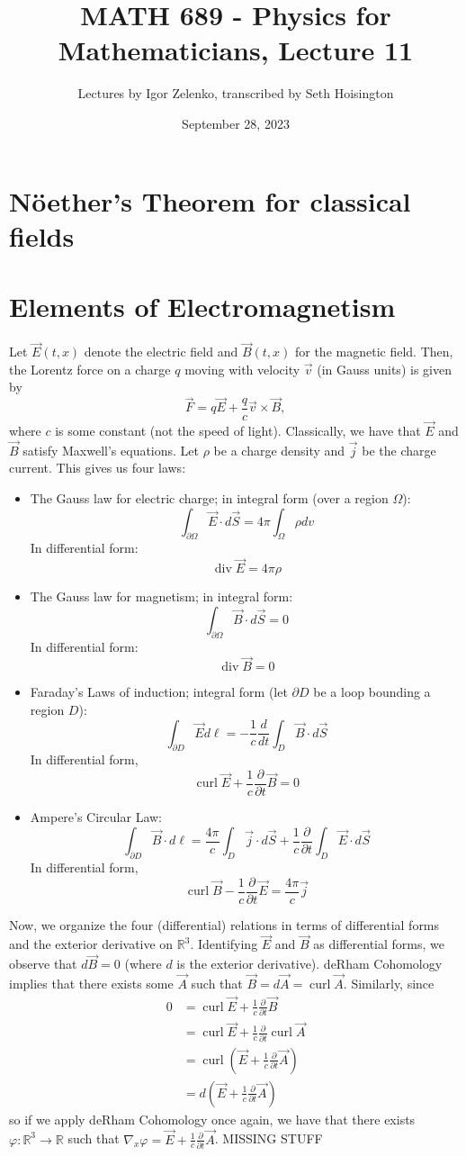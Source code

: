 \documentclass{article}
\title{MATH 689 - Physics for Mathematicians, Lecture 11}
\author{Lectures by Igor Zelenko, transcribed by Seth Hoisington}
\date{September 28, 2023}
\newcommand{\R}{\mathbb R}
\newcommand{\vhi}{\varphi}
\newcommand{\pd}[1]{\frac{\partial}{\partial #1}}
\DeclareMathOperator{\Div}{div}
\DeclareMathOperator{\curl}{curl}
\begin{document}
\maketitle

\section{N\"oether's Theorem for classical fields}
\section{Elements of Electromagnetism}
Let $\vec E(t,x)$ denote the electric field and $\vec B(t,x)$ for the magnetic field. Then, the Lorentz force on  a charge $q$ moving with velocity $\vec v$ (in Gauss units) is given by
\[\vec F = q\vec E + \frac{q}{c}\vec v\times \vec B,\]
where $c$ is some constant (not the speed of light). Classically, we have that $\vec E$ and $\vec B$ satisfy Maxwell's equations. Let $\rho$ be a charge density and $\vec j$ be the charge current. This gives us four laws:
\begin{itemize}
    \item The Gauss law for electric charge; in integral form (over a region $\Omega$):
    \[\int_{\partial \Omega} \vec E\cdot d\vec S = 4\pi \int_\Omega \rho dv\]
    In differential form:
    \[\Div \vec E = 4\pi\rho\]
    \item The Gauss law for magnetism; in integral form:
    \[\int_{\partial \Omega} \vec B\cdot d\vec S = 0\]
    In differential form:
    \[\Div \vec B = 0\]
    \item Faraday's Laws of induction; integral form (let $\partial D$ be a loop bounding a region $D$):
    \[\int_{\partial D} \vec E d\ell = -\frac{1}{c}\frac{d}{dt}\int_{D}\vec B\cdot d\vec S\]
    In differential form,
    \[\curl \vec E + \frac{1}{c}\pd{t}\vec B = 0\]
    \item Ampere's Circular Law:
    \[\int_{\partial D} \vec B\cdot d\ell = \frac{4\pi}{c}\int_{D}\vec j\cdot d\vec S + \frac{1}{c}\pd{t}\int_{D}\vec E\cdot d\vec S\]
    In differential form,
    \[\curl\vec B - \frac{1}{c}\pd{t}\vec E = \frac{4\pi}{c}\vec j\]
\end{itemize}
Now, we organize the four (differential) relations in terms of differential forms and the exterior derivative on $\R^3$. Identifying $\vec E$ and $\vec B$ as differential forms, we observe that $d \vec B  = 0$ (where $d$ is the exterior derivative). deRham Cohomology implies that there exists some $\vec A$ such that $\vec B = d\vec A = \curl \vec A$. Similarly, since 
\begin{align*}
    0 &= \curl \vec E + \frac{1}{c}\pd{t}\vec B\\
    &=\curl \vec E + \frac{1}{c}\pd{t}\curl \vec A\\
    &=\curl \left(\vec E + \frac{1}{c}\pd{t}\vec A\right)\\
    &=d\left(\vec E + \frac{1}{c}\pd{t}\vec A\right)
\end{align*}
so if we apply deRham Cohomology once again, we have that there exists $\vhi:\R^3\to \R$ such that $\nabla_x \vhi = \vec E + \frac{1}{c}\pd{t}\vec A$.
MISSING STUFF
\end{document}
